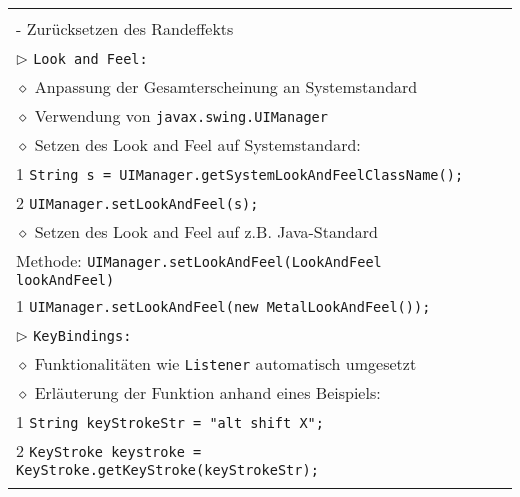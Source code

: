 \begin{longtable}{ | p{} p{} | }
{	\hspace{0.6cm} - \texttt{BorderFactory.createEmptyBorder()} \\
	\hspace{0.8cm} - Zurücksetzen des Randeffekts \\
	$\triangleright$ \texttt{Look and Feel:} \\
	\hspace{0.4cm} $\diamond$ Anpassung der Gesamterscheinung an Systemstandard \\
	\hspace{0.4cm} $\diamond$ Verwendung von \texttt{javax.swing.UIManager} \\
	\hspace{0.4cm} $\diamond$ Setzen des Look and Feel auf Systemstandard: \\
	\hspace{0.8cm} 1 \hspace{0.1cm} \texttt{String s = UIManager.getSystemLookAndFeelClassName();}  \\
	\hspace{0.8cm} 2 \hspace{0.1cm} \texttt{UIManager.setLookAndFeel(s);} \\
	\hspace{0.4cm} $\diamond$ Setzen des Look and Feel auf z.B. Java-Standard \\
	\hspace{0.8cm} Methode: \texttt{UIManager.setLookAndFeel(LookAndFeel lookAndFeel)} \\
	\hspace{0.8cm} 1 \hspace{0.1cm} \texttt{UIManager.setLookAndFeel(new MetalLookAndFeel());}  \\
	$\triangleright$ \texttt{KeyBindings:} \\
	\hspace{0.4cm} $\diamond$ Funktionalitäten wie \texttt{Listener} automatisch umgesetzt \\
	\hspace{0.4cm} $\diamond$ Erläuterung der Funktion anhand eines Beispiels: \\
	\hspace{0.8cm} 1 \hspace{0.1cm} \texttt{String keyStrokeStr = \string"alt shift X\string";} \\
    \hspace{0.8cm} 2 \hspace{0.1cm} \texttt{KeyStroke keystroke = KeyStroke.getKeyStroke(keyStrokeStr);} \\
}
\end{longtable}
